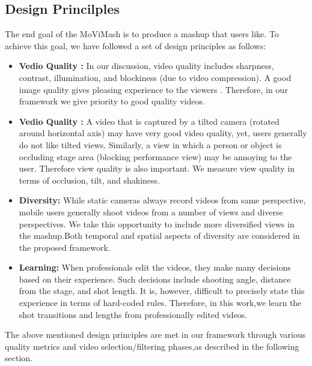 \documentclass{IEEEtran}
\begin{document}
\subsection{Design Princilples}
The end goal of the MoViMash is to produce a mashup that users like. To achieve this goal, we have followed a set of design principles as follows:
\begin{itemize}
    \item \textbf{Vedio Quality : }In our discussion, video quality includes sharpness, contrast, illumination, and blockiness (due to video compression). A good image quality gives pleasing experience to the viewers \cite{web:10}. Therefore, in our framework we give priority to good quality videos.
    \item \textbf{Vedio Quality : }A video that is captured by a tilted camera (rotated around horizontal axis) may have very good video quality, yet, users generally do not like tilted views. Similarly, a view in which a person or object is occluding stage area (blocking performance view) may be annoying to the user. Therefore view quality is also important. We measure view quality in terms of occlusion, tilt, and shakiness.
    \item \textbf{Diversity: }While static cameras always record videos from same perspective, mobile users generally shoot videos from a number of views and diverse perspectives. We take this opportunity to include more diversified views in the mashup.Both temporal and spatial aspects of diversity are considered in the proposed framework.
    \item \textbf{Learning: }When professionals edit the videos, they make many decisions based on their experience. Such decisions include shooting angle, distance from the stage, and shot length. It is, however, difficult to precisely state this experience in terms of hard-coded rules. Therefore, in this work,we learn the shot transitions and lengths from professionally edited videos.
\end{itemize}
The above mentioned design principles are met in our framework through various quality metrics and video selection/filtering phases,as described in the following section.
\end{document}

